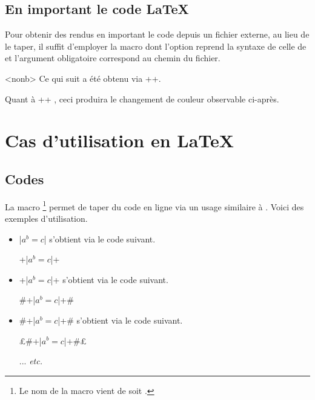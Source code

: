 \subsection{En important le code \LaTeX}

Pour obtenir des rendus en important le code depuis un fichier externe, au lieu de le taper, il suffit d'employer la macro  dont l'option reprend la syntaxe de celle de  et l'argument obligatoire correspond au chemin du fichier.

\begin{bdocexa}<nonb>
    Ce qui suit a été obtenu via \bdocinlatex++.

    \medskip


    \medskip

    Quant à \bdocinlatex++ , ceci produira le changement de couleur observable ci-après.

    \medskip

\end{bdocexa}


\section{Cas d'utilisation en \LaTeX}

\subsection{Codes } \label{bdoc-listing-inline}

La macro 
\footnote{
	Le nom de la macro  vient de  soit .
}
permet de taper du code en ligne via un usage similaire à .
Voici des exemples d'utilisation.
\begin{itemize}
    \item \bdocinlatex|$a^b = c$| s'obtient via le code suivant.
		  \begin{center}
		  		\bdocinlatex+\bdocinlatex|$a^b = c$|+
		  \end{center}


    \item \bdocinlatex+\bdocinlatex|$a^b = c$|+ s'obtient via le code suivant.
		  \begin{center}
		  		\bdocinlatex#\bdocinlatex+\bdocinlatex|$a^b = c$|+#
		  \end{center}


    \item \bdocinlatex#\bdocinlatex+\bdocinlatex|$a^b = c$|+# s'obtient via le code suivant.
		  \begin{center}
		  		\bdocinlatex£\bdocinlatex#\bdocinlatex+\bdocinlatex|$a^b = c$|+#£

				\medskip

				... \emph{etc.}
		  \end{center}
\end{itemize}



